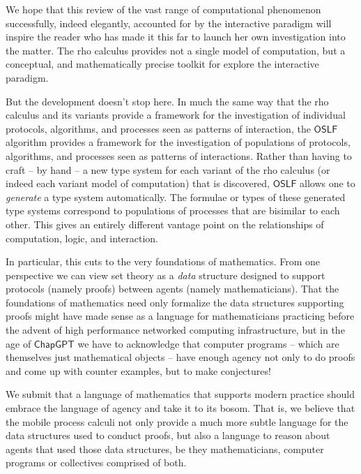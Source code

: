 We hope that this review of the vast range of computational phenomenon
successfully, indeed elegantly, accounted for by the interactive
paradigm will inspire the reader who has made it this far to launch
her own investigation into the matter. The rho calculus provides not a
single model of computation, but a conceptual, and mathematically
precise toolkit for explore the interactive paradigm.

But the development doesn't stop here. In much the same way that the
rho calculus and its variants provide a framework for the
investigation of individual protocols, algorithms, and processes seen
as patterns of interaction, the $\mathsf{OSLF}$ algorithm provides a
framework for the investigation of populations of protocols,
algorithms, and processes seen as patterns of interactions. Rather
than having to craft -- by hand -- a new type system for each variant
of the rho calculus (or indeed each variant model of computation) that
is discovered, $\mathsf{OSLF}$ allows one to \emph{generate} a type
system automatically. The formulae or types of these generated type
systems correspond to populations of processes that are bisimilar to
each other. This gives an entirely different vantage point on the
relationships of computation, logic, and interaction.

In particular, this cuts to the very foundations of mathematics. From
one perspective we can view set theory as a \emph{data} structure
designed to support protocols (namely proofs) between agents (namely
mathematicians). That the foundations of mathematics need only
formalize the data structures supporting proofs might have made sense
as a language for mathematicians practicing before the advent of high
performance networked computing infrastructure, but in the age of
$\mathsf{ChapGPT}$ we have to acknowledge that computer programs --
which are themselves just mathematical objects -- have enough agency
not only to do proofs and come up with counter examples, but to make
conjectures!

We submit that a language of mathematics that supports modern practice
should embrace the language of agency and take it to its bosom. That
is, we believe that the mobile process calculi not only provide a much
more subtle language for the data structures used to conduct proofs,
but also a language to reason about agents that used those data
structures, be they mathematicians, computer programs or collectives
comprised of both.



